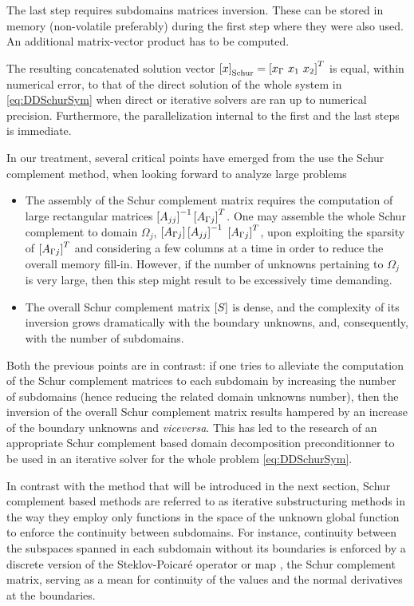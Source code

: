 The last step requires subdomains matrices inversion. These can be stored in memory (non-volatile preferably) during the first step where they were also used. An additional matrix-vector product has to be computed.

The resulting concatenated solution vector $\vect{x}_\mathrm{Schur} = \vect{x_\Gamma \ x_1 \ x_2}^T$ is equal, within numerical error, to that of the direct solution of the whole system in \eqref{eq:DDSchurSym} when direct or iterative solvers are ran up to numerical precision. Furthermore, the parallelization internal to the first and the last steps is immediate.

In our treatment, several critical points have emerged from the use the Schur complement method, when looking forward to analyze large problems

\begin{itemize}
\item The assembly of the Schur complement matrix requires the computation of large rectangular matrices $\left[A_{jj}\right]^{-1} \left[A_{\Gamma j}\right]^T$. One may assemble the whole Schur complement to domain $\Omega_j$, $\left[A_{\Gamma j}\right] \left[A_{jj}\right]^{-1}$ $\left[A_{\Gamma j}\right]^T$, upon exploiting the sparsity of $\left[A_{\Gamma j}\right]^T$ and considering a few columns at a time in order to reduce the overall memory fill-in. However, if the number of unknowns pertaining to $\Omega_j$ is very large, then this step might result to be excessively time demanding.
\item The overall Schur complement matrix $\left[S\right]$ is dense, and the complexity of its inversion grows dramatically with the boundary unknowns, and, consequently, with the number of subdomains.
\end{itemize}

\noindent Both the previous points are in contrast: if one tries to alleviate the computation of the Schur complement matrices to each subdomain by increasing the number of subdomains (hence reducing the related domain unknowns number), then the inversion of the overall Schur complement matrix results hampered by an increase of the boundary unknowns and \textit{viceversa}. This has led to the research of an appropriate Schur complement based domain decomposition preconditionner to be used in an iterative solver for the whole problem \eqref{eq:DDSchurSym}.

In contrast with the method that will be introduced in the next section, Schur complement based methods are referred to as  iterative substructuring methods in the way they employ only functions in the space of the unknown global function to enforce the continuity between subdomains. For instance, continuity between the subspaces spanned in each subdomain without its boundaries is enforced by a discrete version of the Steklov-Poicar\'e operator or  map \cite{mathew2008domain}, the Schur complement matrix, serving as a mean for continuity of the values and the normal derivatives at the boundaries.

